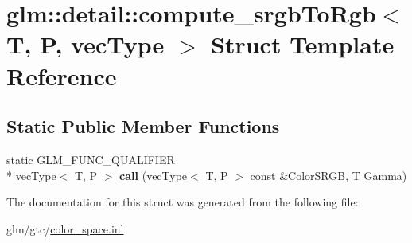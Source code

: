 \hypertarget{structglm_1_1detail_1_1compute__srgbToRgb}{\section{glm\-:\-:detail\-:\-:compute\-\_\-srgb\-To\-Rgb$<$ T, P, vec\-Type $>$ Struct Template Reference}
\label{structglm_1_1detail_1_1compute__srgbToRgb}
}
\subsection*{Static Public Member Functions}
\begin{DoxyCompactItemize}
\item 
\hypertarget{structglm_1_1detail_1_1compute__srgbToRgb_a73d176e6c80940ded57f4e76dc362f72}{static G\-L\-M\-\_\-\-F\-U\-N\-C\-\_\-\-Q\-U\-A\-L\-I\-F\-I\-E\-R \\*
vec\-Type$<$ T, P $>$ {\bfseries call} (vec\-Type$<$ T, P $>$ const \&Color\-S\-R\-G\-B, T Gamma)}\label{structglm_1_1detail_1_1compute__srgbToRgb_a73d176e6c80940ded57f4e76dc362f72}

\end{DoxyCompactItemize}


The documentation for this struct was generated from the following file\-:\begin{DoxyCompactItemize}
\item 
glm/gtc/\hyperlink{gtc_2color__space_8inl}{color\-\_\-space.\-inl}\end{DoxyCompactItemize}

